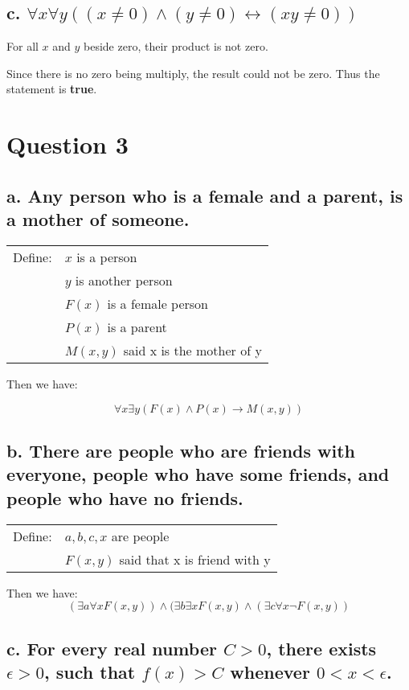 \documentclass{article}
\begin{document}
\subsection*{c. $\forall x \forall y ((x \neq 0) \land (y \neq 0) \leftrightarrow (xy \neq 0))$}

For all $x$ and $y$ beside zero, their product is not zero. 

Since there is no zero being multiply, the result could not be zero. Thus the statement is \textbf{true}.

\section*{Question 3}
\subsection*{a. Any person who is a female and a parent, is a mother of someone.}

\begin{tabular}{rl}
    Define: & $x$ is a person \\
            &    $y$ is another person \\
            &    $F(x)$ is a female person \\
            &    $P(x)$ is a parent \\
            &    $M(x,y)$ said x is the mother of y
\end{tabular}


Then we have:

$$\forall x \exists y (F(x) \land P(x) \rightarrow M(x,y))$$

\subsection*{b. There are people who are friends with everyone, people who have some friends, and
people who have no friends.}

\begin{tabular}{rl}
    Define: & $a, b, c, x$ are people \\
            & $F(x, y)$ said that x is friend with y 
\end{tabular}

Then we have:
$$ (\exists a \forall x F(x, y)) \land 
(\exists b \exists x F(x, y) \land 
(\exists c \forall x \neg F(x,y))$$

\subsection*{c. For every real number $C>0$, there exists $\epsilon > 0$, such that $f(x) > C$ whenever $0 < x < \epsilon$.}
\end{document}
